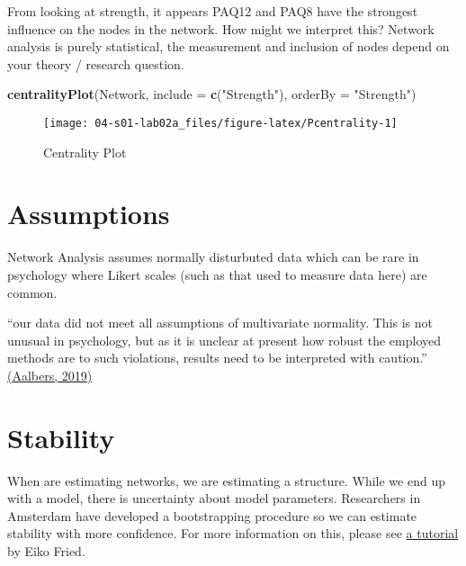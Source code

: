 \documentclass[]{book}
\newenvironment{Shaded}{\begin{snugshade}}{\end{snugshade}}
\newcommand{\DataTypeTok}[1]{\textcolor[rgb]{0.13,0.29,0.53}{#1}}
\newcommand{\KeywordTok}[1]{\textcolor[rgb]{0.13,0.29,0.53}{\textbf{#1}}}
\newcommand{\NormalTok}[1]{#1}
\newcommand{\StringTok}[1]{\textcolor[rgb]{0.31,0.60,0.02}{#1}}
\begin{document}
From looking at strength, it appears PAQ12 and PAQ8 have the strongest influence on the nodes in the network. How might we interpret this? Network analysis is purely statistical, the measurement and inclusion of nodes depend on your theory / research question.

\begin{Shaded}
\begin{Highlighting}[]
\KeywordTok{centralityPlot}\NormalTok{(Network, }\DataTypeTok{include =} \KeywordTok{c}\NormalTok{(}\StringTok{"Strength"}\NormalTok{),}
               \DataTypeTok{orderBy =} \StringTok{"Strength"}\NormalTok{)}
\end{Highlighting}
\end{Shaded}

\begin{figure}

{\centering \texttt{[image: 04-s01-lab02a\_files/figure-latex/Pcentrality-1]} 

}

\caption{Centrality Plot}\label{fig:Pcentrality}
\end{figure}

\hypertarget{assumptions}{%
\section{Assumptions}\label{assumptions}}

Network Analysis assumes normally disturbuted data which can be rare in psychology where Likert scales (such as that used to measure data here) are common.

``our data did not meet all assumptions of multivariate normality. This is not unusual in psychology, but as it is unclear at present how robust the employed methods are to such violations, results need to be interpreted with caution.'' \href{https://openaccess.leidenuniv.nl/bitstream/handle/1887/73951/Aalbers_et_al_2018_T.pdf?sequence=1}{(Aalbers, 2019)}

\hypertarget{stability}{%
\section{Stability}\label{stability}}

When are estimating networks, we are estimating a structure. While we end up with a model, there is uncertainty about model parameters. Researchers in Amsterdam have developed a bootstrapping procedure so we can estimate stability with more confidence. For more information on this, please see \href{https://psych-networks.com/r-tutorial-power-issues-robustness-network-models/}{a tutorial} by Eiko Fried.
\end{document}
